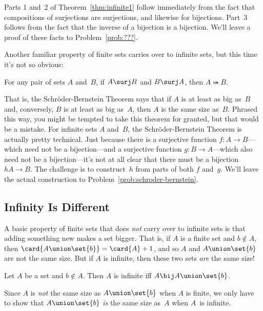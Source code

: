 Parts 1 and~2 of Theorem~\ref{thm:infinite1} follow immediately from
the fact that compositions of surjections are surjections, and
likewise for bijections.  Part~3 follows from the fact that the
inverse of a bijection is a bijection.  We'll leave a proof of these
facts to Problem~\ref{prob:???}.

Another familiar property of finite sets carries over to infinite
sets, but this time it's not so obvious:

\begin{theorem}\label{schroder-bernstein}
For any pair of sets $A$ and~$B$, if $A \surj B$ and $B \surj A$, then
$A \bij B$.
\end{theorem}

That is, the Schr\"oder-Bernstein Theorem says that if $A$ is at least
as big as~$B$ and, conversely, $B$ is at least as big as~$A$, then $A$
is the same size as~$B$.  Phrased this way, you might be tempted to
take this theorem for granted, but that would be a mistake.  For
infinite sets $A$ and~$B$, the Schr\"oder-Bernstein Theorem is
actually pretty technical.  Just because there is a surjective
function $f: A \to B$---which need not be a bijection---and a
surjective function $g: B \to A$---which also need not be a
bijection---it's not at all clear that there must be a bijection $h A
\to B$.  The challenge is to construct~$h$ from parts of both $f$
and~$g$.  We'll leave the actual construction to
Problem~\ref{prob:schroder-bernstein}.

\subsection{Infinity Is Different}

A basic property of finite sets that does \emph{not} carry over to
infinite sets is that adding something new makes a set bigger.  That
is, if $A$ is a finite set and $b \notin A$, then $\card{A \union
  \set{b}} = \card{A} + 1$, and so $A$ and $A \union \set{b}$ are not
the same size.  But if $A$ is infinite, then these two sets \emph{are}
the same size!

\begin{theorem}\label{thm:infinite2}
Let $A$ be a set and $b \notin A$.  Then $A$ is infinite iff $A \bij A
\union \set{b}$.
\end{theorem}

Since $A$ is \emph{not} the same size as $A \union \set{b}$ when $A$
is finite, we only have to show that $A \union \set{b}$ \emph{is} the
same size as~$A$ when $A$~is infinite.

